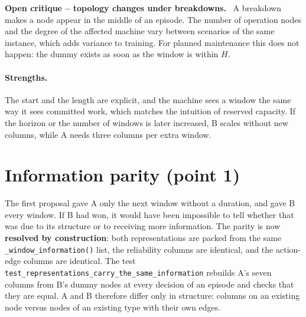 \documentclass[11pt,a4paper]{article}
\newenvironment{critique}[1]{%
  \par\medskip\noindent\textbf{\color{critic}Open critique -- #1.}\ }{\par\medskip}
\newcommand{\code}[1]{\texttt{#1}}
\begin{document}
\begin{critique}{topology changes under breakdowns}
A breakdown makes a node appear in the middle of an episode. The number of operation nodes and
the degree of the affected machine vary between scenarios of the same instance, which adds
variance to training. For planned maintenance this does not happen: the dummy exists as soon as
the window is within $H$.
\end{critique}

\paragraph{Strengths.} The start and the length are explicit, and the machine sees a window the
same way it sees committed work, which matches the intuition of reserved capacity. If the
horizon or the number of windows is later increased, B scales without new columns, while A needs
three columns per extra window.

\section{Information parity (point 1)}
\label{sec:parity}

The first proposal gave A only the next window without a duration, and gave B every window. If
B had won, it would have been impossible to tell whether that was due to its structure or to
receiving more information. The parity is now \textbf{resolved by construction}: both
representations are packed from the same \code{\_window\_information()} list, the reliability
columns are identical, and the action-edge columns are identical. The test
\code{test\_representations\_carry\_the\_same\_information} rebuilds A's seven columns from B's
dummy nodes at every decision of an episode and checks that they are equal. A and B therefore
differ only in structure: columns on an existing node versus nodes of an existing type with
their own edges.
\end{document}
